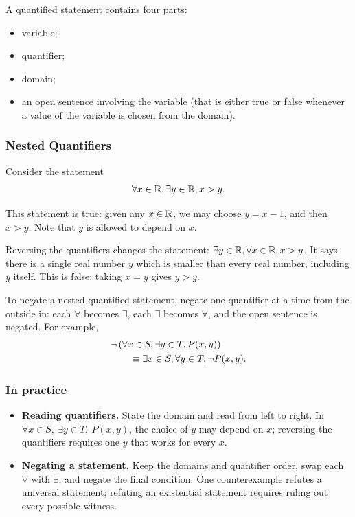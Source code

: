 \begin{remark}
    A quantified statement contains four parts:
    \begin{itemize}
        \item variable;
        \item quantifier;
        \item domain;
        \item an open sentence involving the variable (that is either true or false whenever a value of the variable is chosen from the domain).
    \end{itemize}
\end{remark}

\subsubsection{Nested Quantifiers}
Consider the statement
\begin{equation*}
    \forall x \in \mathbb{R}, \exists y \in \mathbb{R}, x > y.
\end{equation*}

This statement is true: given any $x \in \mathbb{R}$, we may choose $y = x - 1$, and then $x > y$.
Note that $y$ is allowed to depend on $x$.

\begin{remark}
    Reversing the quantifiers changes the statement:
    $\exists y \in \mathbb{R}, \forall x \in \mathbb{R}, x > y$.
    It says there is a single real number $y$ which is smaller than every real number,
    including $y$ itself. This is false: taking $x = y$ gives $y > y$.
\end{remark}

\medskip\noindent
To negate a nested quantified statement, negate one quantifier at a time from the outside in:
each $\forall$ becomes $\exists$, each $\exists$ becomes $\forall$, and the open sentence is negated.
For example,
\begin{align*}
    &\neg \left(\forall x \in S, \exists y \in T, P(x, y)\right)\\
    &\qquad\equiv \exists x \in S, \forall y \in T, \neg P(x, y).
\end{align*}

\subsubsection*{In practice}
\begin{itemize}
    \item \textbf{Reading quantifiers.} State the domain and read from left
    to right. In $\forall x\in S,\ \exists y\in T,\ P(x,y)$, the choice of
    $y$ may depend on $x$; reversing the quantifiers requires one $y$ that
    works for every $x$.
    \item \textbf{Negating a statement.} Keep the domains and quantifier
    order, swap each $\forall$ with $\exists$, and negate the final condition.
    One counterexample refutes a universal statement; refuting an existential
    statement requires ruling out every possible witness.
\end{itemize}
